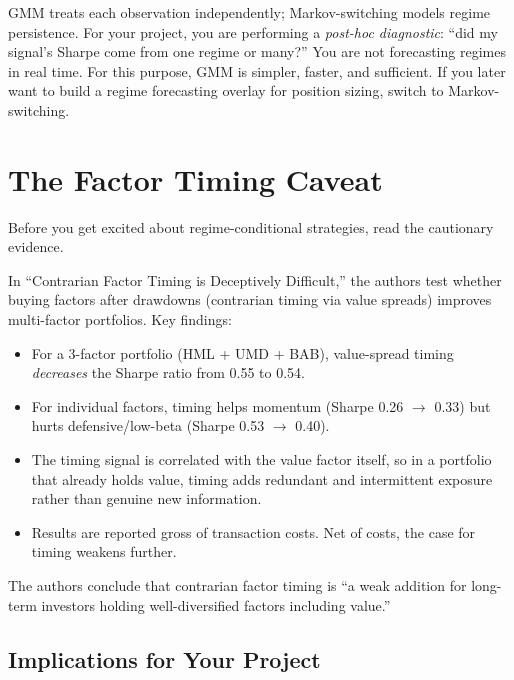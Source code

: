 \begin{keyidea}
GMM treats each observation independently; Markov-switching models regime
persistence.  For your project, you are performing a \emph{post-hoc
diagnostic}: ``did my signal's Sharpe come from one regime or many?''
You are not forecasting regimes in real time.  For this purpose, GMM is
simpler, faster, and sufficient.  If you later want to build a regime
forecasting overlay for position sizing, switch to Markov-switching.
\end{keyidea}

\section{The Factor Timing Caveat}
\label{sec:regimes:timing-caveat}

Before you get excited about regime-conditional strategies, read the
cautionary evidence.

\begin{keyresult}
In ``Contrarian Factor Timing is Deceptively Difficult,'' the authors test
whether buying factors after drawdowns (contrarian timing via value spreads)
improves multi-factor portfolios.  Key findings:
\begin{itemize}[leftmargin=1.5em]
  \item For a 3-factor portfolio (HML + UMD + BAB), value-spread timing
        \emph{decreases} the Sharpe ratio from 0.55 to 0.54.
  \item For individual factors, timing helps momentum (Sharpe 0.26
        $\to$ 0.33) but hurts defensive/low-beta (Sharpe 0.53 $\to$ 0.40).
  \item The timing signal is correlated with the value factor itself, so
        in a portfolio that already holds value, timing adds redundant and
        intermittent exposure rather than genuine new information.
  \item Results are reported gross of transaction costs.  Net of costs,
        the case for timing weakens further.
\end{itemize}
The authors conclude that contrarian factor timing is ``a weak addition for
long-term investors holding well-diversified factors including value.''
\end{keyresult}

\subsection{Implications for Your Project}
\label{sec:regimes:implications}

